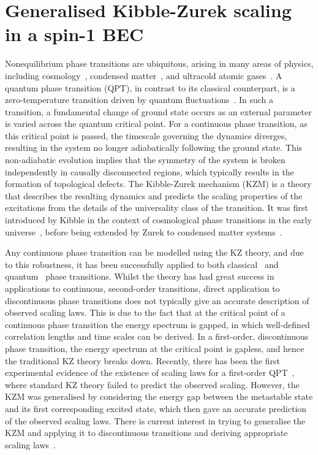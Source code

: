 \chapter{Generalised Kibble-Zurek scaling in a spin-1 BEC}\label{chap: spin-1}

Nonequilibrium phase transitions are ubiquitous, arising in many areas of
physics, including cosmology~\cite{Kibble1980,Mazumdar2019}, condensed
matter~\cite{Chuang1991,Hendry1994,Bauerle1996,Ruutu1996,Sondhi1997,
Polkovnikov2011}, and ultracold atomic gases~\cite{Hadzibabic2006,Langen2015,
Fletcher2015,Liu2018}.
A quantum phase transition (QPT), in contrast to its classical counterpart, is a
zero-temperature transition driven by quantum fluctuations~\cite{Sachdev2011}.
In such a transition, a fundamental change of ground state occurs as an external
parameter is varied across the quantum critical point.
For a continuous phase transition, as this critical point is passed, the
timescale governing the dynamics diverges, resulting in the system no longer
adiabatically following the ground state.
This non-adiabatic evolution implies that the symmetry of the system is broken
independently in causally disconnected regions, which typically results in the
formation of topological defects.
The Kibble-Zurek mechanism (KZM) is a theory that describes the resulting
dynamics and predicts the scaling properties of the excitations from the details
of the universality class of the transition.
It was first introduced by Kibble in the context of cosmological phase
transitions in the early universe~\cite{Kibble1976, Kibble1980}, before being
extended by Zurek to condensed matter systems~\cite{Zurek1985, Zurek1993,
    Zurek1996}.

Any continuous phase transition can be modelled using the KZ theory, and due to
this robustness, it has been successfully applied to both
classical~\cite{Donadello2016,Beugnon2017} and
quantum~\cite{Dziarmaga2005, Damski2005, Lamacraft2007} phase transitions.
Whilst the theory has had great success in applications to continuous,
second-order transitions, direct application to discontinuous phase transitions
does not typically give an accurate description of observed scaling laws.
This is due to the fact that at the critical point of a continuous phase
transition the energy spectrum is gapped, in which well-defined correlation
lengths and time scales can be derived.
In a first-order, discontinuous phase transition, the energy spectrum at the
critical point is gapless, and hence the traditional KZ theory breaks down.
Recently, there has been the first experimental evidence of the existence of
scaling laws for a first-order QPT~\cite{Qiu2020}, where standard KZ theory
failed to predict the observed scaling.
However, the KZM was generalised by considering the energy gap between the
metastable state and its first corresponding excited state, which then gave an
accurate prediction of the observed scaling laws.
There is current interest in trying to generalise the KZM and applying it to
discontinuous transitions and deriving appropriate scaling
laws~\cite{Divakaran2008, Suzuki2015}.

